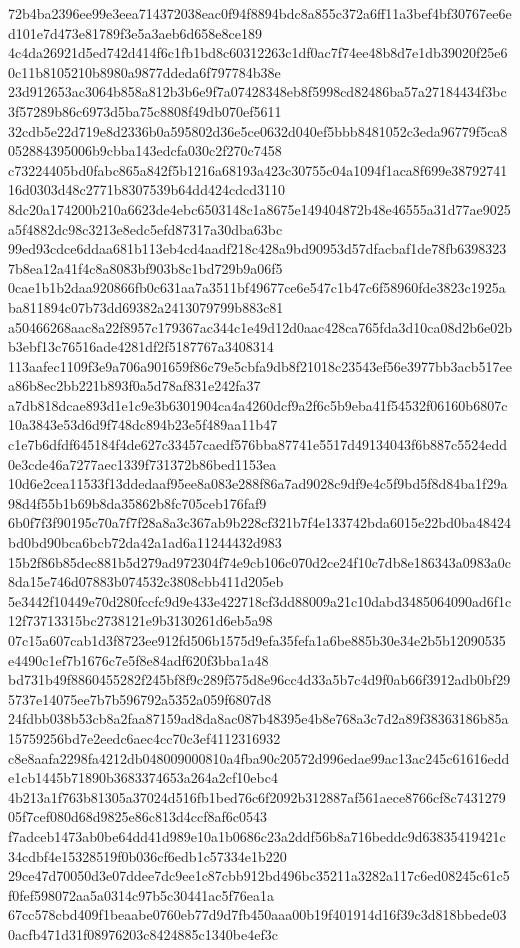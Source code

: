 \documentclass[11pt,a4paper]{article}
\begin{document}
{72b4ba2396ee99e3eea714372038eac0f94f8894bdc8a855c372a6ff11a3bef4bf30767ee6ed101e7d473e81789f3e5a3aeb6d658e8ce189
4c4da26921d5ed742d414f6c1fb1bd8c60312263c1df0ac7f74ee48b8d7e1db39020f25e60c11b8105210b8980a9877ddeda6f797784b38e
23d912653ac3064b858a812b3b6e9f7a07428348eb8f5998cd82486ba57a27184434f3bc3f57289b86c6973d5ba75c8808f49db070ef5611
32cdb5e22d719e8d2336b0a595802d36e5ce0632d040ef5bbb8481052c3eda96779f5ca8052884395006b9cbba143edcfa030c2f270c7458
c73224405bd0fabc865a842f5b1216a68193a423c30755c04a1094f1aca8f699e3879274116d0303d48c2771b8307539b64dd424cdcd3110
8dc20a174200b210a6623de4ebc6503148c1a8675e149404872b48e46555a31d77ae9025a5f4882dc98c3213e8edc5efd87317a30dba63bc
99ed93cdce6ddaa681b113eb4cd4aadf218c428a9bd90953d57dfacbaf1de78fb63983237b8ea12a41f4c8a8083bf903b8c1bd729b9a06f5
0cae1b1b2daa920866fb0c631aa7a3511bf49677ce6e547c1b47c6f58960fde3823c1925aba811894c07b73dd69382a2413079799b883c81
a50466268aac8a22f8957c179367ac344c1e49d12d0aac428ca765fda3d10ca08d2b6e02bb3ebf13c76516ade4281df2f5187767a3408314
113aafec1109f3e9a706a901659f86c79e5cbfa9db8f21018c23543ef56e3977bb3acb517eea86b8ec2bb221b893f0a5d78af831e242fa37
a7db818dcae893d1e1c9e3b6301904ca4a4260dcf9a2f6c5b9eba41f54532f06160b6807c10a3843e53d6d9f748dc894b23e5f489aa11b47
c1e7b6dfdf645184f4de627c33457caedf576bba87741e5517d49134043f6b887c5524edd0e3cde46a7277aec1339f731372b86bed1153ea
10d6e2cea11533f13ddedaaf95ee8a083e288f86a7ad9028c9df9e4c5f9bd5f8d84ba1f29a98d4f55b1b69b8da35862b8fc705ceb176faf9
6b0f7f3f90195c70a7f7f28a8a3c367ab9b228cf321b7f4e133742bda6015e22bd0ba48424bd0bd90bca6bcb72da42a1ad6a11244432d983
15b2f86b85dec881b5d279ad972304f74e9cb106c070d2ce24f10c7db8e186343a0983a0c8da15e746d07883b074532c3808cbb411d205eb
5e3442f10449e70d280fccfc9d9e433e422718cf3dd88009a21c10dabd3485064090ad6f1c12f73713315bc2738121e9b3130261d6eb5a98
07c15a607cab1d3f8723ee912fd506b1575d9efa35fefa1a6be885b30e34e2b5b12090535e4490c1ef7b1676c7e5f8e84adf620f3bba1a48
bd731b49f8860455282f245bf8f9c289f575d8e96cc4d33a5b7c4d9f0ab66f3912adb0bf295737e14075ee7b7b596792a5352a059f6807d8
24fdbb038b53cb8a2faa87159ad8da8ac087b48395e4b8e768a3c7d2a89f38363186b85a15759256bd7e2eedc6aec4cc70c3ef4112316932
c8e8aafa2298fa4212db048009000810a4fba90c20572d996edae99ac13ac245c61616edde1cb1445b71890b3683374653a264a2cf10ebc4
4b213a1f763b81305a37024d516fb1bed76c6f2092b312887af561aece8766cf8c743127905f7cef080d68d9825e86c813d4ccf8af6c0543
f7adceb1473ab0be64dd41d989e10a1b0686c23a2ddf56b8a716beddc9d63835419421c34cdbf4e15328519f0b036cf6edb1c57334e1b220
29ce47d70050d3e07ddee7dc9ee1c87cbb912bd496bc35211a3282a117c6ed08245c61c5f0fef598072aa5a0314c97b5c30441ac5f76ea1a
67cc578cbd409f1beaabe0760eb77d9d7fb450aaa00b19f401914d16f39c3d818bbede030acfb471d31f08976203c8424885c1340be4ef3c
}
\end{document}
